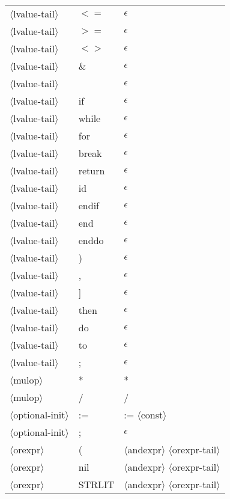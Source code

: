 \documentclass[11pt, fleqn]{article}
\newcommand{\atag}[1]{$\langle$#1$\rangle$}
\begin{document}
\begin{longtable}{l|l|l}
\atag{lvalue-tail}				&	$<=$		&	$\epsilon$											\\
\atag{lvalue-tail}				&	$>=$		&	$\epsilon$											\\
\atag{lvalue-tail}				&	$<>$		&	$\epsilon$											\\
\atag{lvalue-tail}				&	\&		&	$\epsilon$											\\
\atag{lvalue-tail}				&	\textbar		&	$\epsilon$											\\
\atag{lvalue-tail}				&	if		&		$\epsilon$										\\
\atag{lvalue-tail}				&	while		&		$\epsilon$										\\
\atag{lvalue-tail}				&	for		&		$\epsilon$										\\
\atag{lvalue-tail}				&	break		&	$\epsilon$											\\
\atag{lvalue-tail}				&	return		&	$\epsilon$											\\
\atag{lvalue-tail}				&	id		&		$\epsilon$										\\
\atag{lvalue-tail}				&	endif		&	$\epsilon$											\\
\atag{lvalue-tail}				&	end		&		$\epsilon$										\\
\atag{lvalue-tail}				&	enddo	&		$\epsilon$										\\
\atag{lvalue-tail}				&	)		&	$\epsilon$											\\
\atag{lvalue-tail}				&	,		&	$\epsilon$											\\
\atag{lvalue-tail}				&	]		&	$\epsilon$											\\
\atag{lvalue-tail}				&	then		&	$\epsilon$											\\
\atag{lvalue-tail}				&	do		&	$\epsilon$											\\
\atag{lvalue-tail}				&	to		&	$\epsilon$											\\
\atag{lvalue-tail}				&	;		&	$\epsilon$											\\
\atag{mulop}						&	*		&	*													\\
\atag{mulop}						&	/		&	/													\\
\atag{optional-init}				&	:=		&	:= \atag{const}	\\
\atag{optional-init}				&	;		& $\epsilon$		\\
\atag{orexpr} 					&	(			&	\atag{andexpr} \atag{orexpr-tail}	\\
\atag{orexpr} 					&	nil			&	\atag{andexpr} \atag{orexpr-tail}	\\
\atag{orexpr} 					&	STRLIT			&	\atag{andexpr} \atag{orexpr-tail}	\\

\end{longtable}
\end{document}
